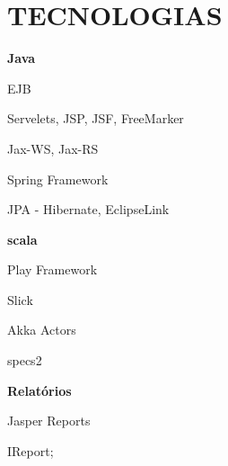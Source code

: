\documentclass[paper=a4,fontsize=14pt]{article}
\let\olditemize\itemize
\let\endolditemize\enditemize
\renewenvironment{itemize}{%
    \small
    \olditemize
}{%
    \endolditemize
}
\newcommand{\NewPart}[1]{ \section*{\large \uppercase{#1}}}
\begin{document}
\NewPart{Tecnologias}{}
\begin{multicols}{3}[]
\begin{itemize}[nolistsep]
    \item[] \hspace{-0.5cm} \textbf{Java}
    \item EJB
    \item Servelets, JSP, JSF, FreeMarker
    \item Jax-WS, Jax-RS
    \item Spring Framework
    \item JPA - Hibernate, EclipseLink  
\end{itemize}
\columnbreak
\begin{itemize}[nolistsep]
    \item[] \hspace{-0.5cm} \textbf{scala}
    \item Play Framework
    \item Slick
    \item Akka Actors
    \item specs2
\end{itemize}
\columnbreak
\begin{itemize}[nolistsep]
    \item[] \hspace{-0.5cm} \textbf{Relatórios}
    \item Jasper Reports
    \item IReport;
\end{itemize}
\end{multicols}
\end{document}
